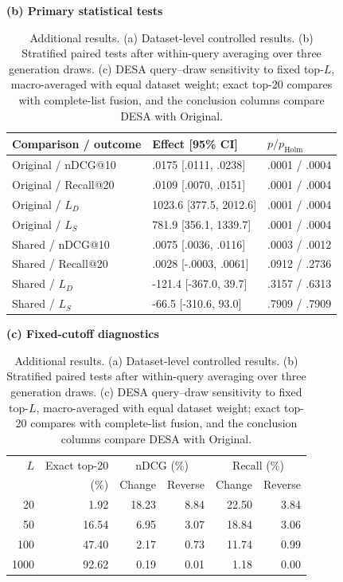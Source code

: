 \begin{table}[!t]
\medskip
\begin{minipage}[t]{0.49\textwidth}
\centering
\textbf{(b) Primary statistical tests}\par\smallskip
\setlength{\tabcolsep}{1.2pt}
\begin{tabular}{lll}
\toprule
Comparison / outcome & Effect [95\% CI] & $p/p_{\mathrm{Holm}}$ \\
\midrule
Original / nDCG@10   & .0175 [.0111, .0238]    & .0001 / .0004 \\
Original / Recall@20 & .0109 [.0070, .0151]    & .0001 / .0004 \\
Original / $L_D$     & 1023.6 [377.5, 2012.6]  & .0001 / .0004 \\
Original / $L_S$     & 781.9 [356.1, 1339.7]   & .0001 / .0004 \\
\addlinespace
Shared / nDCG@10     & .0075 [.0036, .0116]     & .0003 / .0012 \\
Shared / Recall@20   & .0028 [-.0003, .0061]    & .0912 / .2736 \\
Shared / $L_D$       & -121.4 [-367.0, 39.7]    & .3157 / .6313 \\
Shared / $L_S$       & -66.5 [-310.6, 93.0]     & .7909 / .7909 \\
\bottomrule
\end{tabular}
\end{minipage}\hfill
\begin{minipage}[t]{0.49\textwidth}
\centering
\textbf{(c) Fixed-cutoff diagnostics}\par\smallskip
\setlength{\tabcolsep}{2.2pt}
\begin{tabular}{rrrrrr}
\toprule
$L$ & Exact top-20 & \multicolumn{2}{c}{nDCG (\%)} & \multicolumn{2}{c}{Recall (\%)} \\
 & (\%) & Change & Reverse & Change & Reverse \\
\midrule
20   & 1.92 & 18.23 & 8.84 & 22.50 & 3.84 \\
50   & 16.54 & 6.95 & 3.07 & 18.84 & 3.06 \\
100  & 47.40 & 2.17 & 0.73 & 11.74 & 0.99 \\
1000 & 92.62 & 0.19 & 0.01 & 1.18 & 0.00 \\
\bottomrule
\end{tabular}
\end{minipage}
\caption{Additional results. (a) Dataset-level controlled results. (b)
Stratified paired tests after within-query averaging over three generation
draws. (c) DESA query--draw sensitivity to fixed top-$L$, macro-averaged with
equal dataset weight; exact top-20 compares with complete-list fusion, and the
conclusion columns compare DESA with Original.}
\label{tab:per-dataset-controlled}
\label{tab:primary-tests}
\label{tab:cutoff-query-diagnostics}
\end{table}